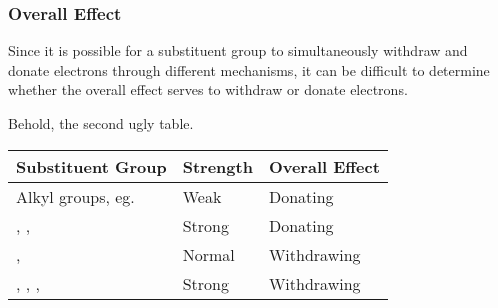 


	\pagebreak
	\subsubsection{Overall Effect}

		Since it is possible for a substituent group to simultaneously withdraw and donate electrons through different mechanisms,
		it can be difficult to determine whether the overall effect serves to withdraw or donate electrons.

		Behold, the second ugly table.

		\begin{center}\begin{table}[ht]\renewcommand{\arraystretch}{1.4}
		\begin{tabu} to \textwidth {| X[c,m] | X[c,m] | X[c,m] |}

			\hline				Substituent Group				&	Strength	&	Overall Effect	\\

			\hline		Alkyl groups, eg. 				&		Weak	&		Donating	\\
			\hline		{}, , 			&	Strong		&		Donating 	\\
			\hline		\ch{\chlorine}, 					&	Normal		&	Withdrawing		\\
			\hline		{}, , , 	&	Strong		&	Withdrawing		\\
			\hline

		\end{tabu}
		\end{table}\end{center}


















